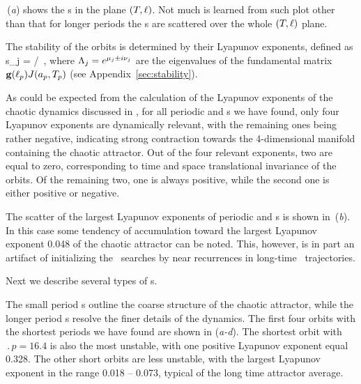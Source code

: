 \,(\textit{a}) shows the \rpo s in the plane
$(\period{},\shift)$.  Not much is learned from such plot other than
that for longer periods the \rpo s are scattered over the
whole $(\period{},\shift)$ plane.

The stability of the orbits is determined by their Lyapunov exponents,
defined as
\beq
	s_j = \eigRe[j]/ \,,
where $\ExpaEig_j = e^{\eigRe[j] \pm i \eigIm[j]}$ are the
eigenvalues of the fundamental matrix $\mathbf{g}(\shift_p)J(a_p,\period{p})$ 
(see Appendix~\ref{sec:stability}).

As could be expected from the calculation of the Lyapunov exponents
of the chaotic dynamics discussed in , for all
periodic and \rpo s we have found, only four Lyapunov
exponents are dynamically relevant, with the remaining ones being
rather negative, indicating strong contraction towards the
4-dimensional manifold containing the chaotic attractor.  Out of the
four relevant exponents, two are equal to zero, corresponding to
time and space translational invariance of the orbits.  Of the
remaining two, one is always positive, while the second one is
either positive or negative.

The scatter of the largest Lyapunov exponents
of periodic and \rpo s is shown in \,(\textit{b}).
In this case some tendency of accumulation toward the largest
Lyapunov exponent 0.048 of the chaotic attractor
can be noted.  This, however, is in part an artifact of initializing
the \rpo\ searches by near recurrences in long-time \statesp\
trajectories.

Next we describe several types of \rpo s.


The small period \rpo s outline the coarse structure of the chaotic
attractor, while the longer period \rpo s resolve the finer details
of the dynamics.
The first four orbits with the shortest periods we have found are
shown in \reffig{f:ks22rpos}(\textit{a-d}).  The shortest orbit with
$\period{p} = 16.4$ is also the most unstable, with one positive
Lyapunov exponent equal 0.328.  The other short orbits are less
unstable, with the largest Lyapunov exponent %
in the range
0.018 -- 0.073, typical of the long time attractor average.

